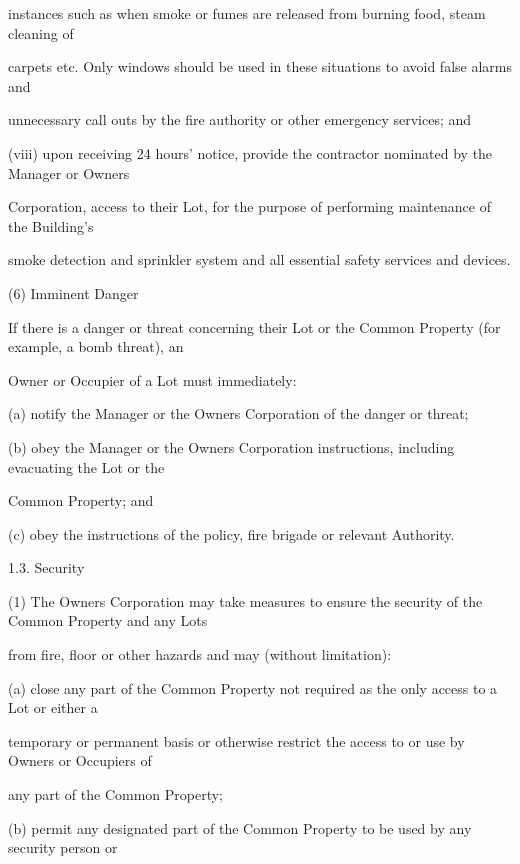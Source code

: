 \documentclass{article}
\begin{document}
{\fontsize{10.02}{1}instances such as when smoke or fumes are released from burning food, steam cleaning of }

{\fontsize{10.02}{1}carpets etc. Only windows should be used in these situations to avoid false alarms and }

{\fontsize{10.02}{1}unnecessary call outs by the fire authority or other emergency services; and }

{\fontsize{9.962}{1}(viii) upon receiving 24 hours’ notice, provide the contractor nominated by the Manager or Owners }

{\fontsize{10.02}{1}Corporation, access to their Lot, for the purpose of performing maintenance of the Building’s }

{\fontsize{10.02}{1}smoke detection and sprinkler system and all essential safety services and devices. }

{\fontsize{9.962}{1}(6) Imminent Danger }

{\fontsize{10.02}{1}If there is a danger or threat concerning their Lot or the Common Property (for example, a bomb threat), an }

{\fontsize{10.02}{1}Owner or Occupier of a Lot must immediately: }

{\fontsize{9.962}{1}(a) notify the Manager or the Owners Corporation of the danger or threat; }

{\fontsize{9.962}{1}(b) obey the Manager or the Owners Corporation instructions, including evacuating the Lot or the }

{\fontsize{10.02}{1}Common Property; and }

{\fontsize{9.962}{1}(c) obey the instructions of the policy, fire brigade or relevant Authority. }

{\fontsize{9.99}{1}1.3. Security }

{\fontsize{9.962}{1}(1) The Owners Corporation may take measures to ensure the security of the Common Property and any Lots }

{\fontsize{10.02}{1}from fire, floor or other hazards and may (without limitation): }

{\fontsize{9.962}{1}(a) close any part of the Common Property not required as the only access to a Lot or either a }

{\fontsize{10.02}{1}temporary or permanent basis or otherwise restrict the access to or use by Owners or Occupiers of }

{\fontsize{10.02}{1}any part of the Common Property; }

{\fontsize{9.962}{1}(b) permit any designated part of the Common Property to be used by any security person or }
\end{document}
